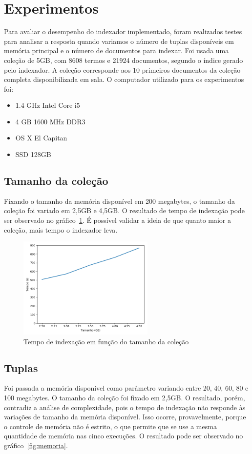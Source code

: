 \documentclass[paper=a4, fontsize=11pt]{scrartcl}
\numberwithin{equation}{section}		%
\numberwithin{figure}{section}			%
\numberwithin{table}{section}				%
\begin{document}
\section{Experimentos}
Para avaliar o desempenho do indexador implementado, foram realizados testes para analisar a resposta quando variamos o número de tuplas disponíveis em memória principal e o número de documentos para indexar. Foi usada uma coleção de 5GB, com 8608 termos e 21924 documentos, segundo o índice gerado pelo indexador. A coleção corresponde aos 10 primeiros documentos da coleção completa disponibilizada em sala. O computador utilizado para os experimentos foi:
\begin{itemize}
  \item 1.4 GHz Intel Core i5
  \item 4 GB 1600 MHz DDR3
  \item OS X El Capitan
  \item SSD 128GB
\end{itemize}

\subsection{Tamanho da coleção}
Fixando o tamanho da memória disponível em 200 megabytes, o tamanho da coleção foi variado em 2,5GB e 4,5GB. O resultado de tempo de indexação pode ser observado no gráfico~\ref{fig:tamanho}. É possível validar a ideia de que quanto maior a coleção, mais tempo o indexador leva.

\begin{figure}
  \caption{Tempo de indexação em função do tamanho da coleção}
  \label{fig:tamanho}
  \centering
    \includegraphics[width=0.6\textwidth]{tamanho}
\end{figure}

\subsection{Tuplas}
Foi passada a memória disponível como parâmetro variando entre 20, 40, 60, 80 e 100 megabytes. O tamanho da coleção foi fixado em 2,5GB. O resultado, porém, contradiz a análise de complexidade, pois o tempo de indexação não responde às variações de tamanho da memória disponível. Isso ocorre, provavelmente, porque o controle de memória não é estrito, o que permite que se use a mesma quantidade de memória nas cinco execuções. O resultado pode ser observado no gráfico~\ref{fig:memoria}.
\end{document}
